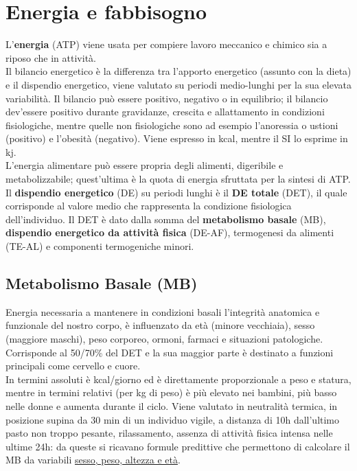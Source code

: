\documentclass[10pt]{article}
\begin{document}
\tableofcontents
\pagebreak
\section{Energia e fabbisogno}
L'\textbf{energia} (ATP) viene usata per compiere lavoro meccanico e chimico sia a riposo che in attività.\\
Il bilancio energetico è la differenza tra l'apporto energetico (assunto con la dieta) e il dispendio energetico, viene valutato su periodi medio-lunghi per la sua elevata variabilità. Il bilancio può essere positivo, negativo o in equilibrio; il bilancio dev'essere positivo durante gravidanze, crescita e allattamento in condizioni fisiologiche, mentre quelle non fisiologiche sono ad esempio l'anoressia o ustioni (positivo) e l'obesità (negativo). Viene espresso in kcal, mentre il SI lo esprime in kj.\\
L'energia alimentare può essere propria degli alimenti, digeribile e metabolizzabile; quest'ultima è la quota di energia sfruttata per la sintesi di ATP.\\
Il \textbf{dispendio energetico} (DE) su periodi lunghi è il \textbf{DE totale} (DET), il quale corrisponde al valore medio che rappresenta la condizione fisiologica dell'individuo. Il DET è dato dalla somma del \textbf{metabolismo basale} (MB), \textbf{dispendio energetico da attività fisica} (DE-AF), termogenesi da alimenti (TE-AL) e componenti termogeniche minori.
\subsection{Metabolismo Basale (MB)}
Energia necessaria a mantenere in condizioni basali l'integrità anatomica e funzionale del nostro corpo, è influenzato da età (minore vecchiaia), sesso (maggiore maschi), peso corporeo, ormoni, farmaci e situazioni patologiche. Corrisponde al 50/70\% del DET e la sua maggior parte è destinato a funzioni principali come cervello e cuore.\\
In termini assoluti è kcal/giorno ed è direttamente proporzionale a peso e statura, mentre in termini relativi (per kg di peso) è più elevato nei bambini, più basso nelle donne e aumenta durante il ciclo. Viene valutato in neutralità termica, in posizione supina da 30 min di un individuo vigile, a distanza di 10h dall'ultimo pasto non troppo pesante, rilassamento, assenza di attività fisica intensa nelle ultime 24h: da queste si ricavano formule predittive che permettono di calcolare il MB da variabili \underline{sesso, peso, altezza e età}.
\end{document}
